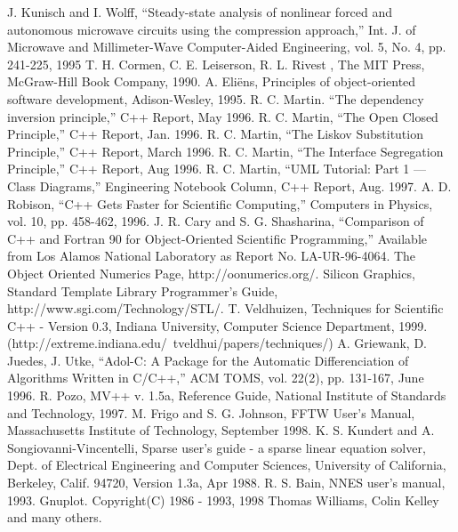 \begin{thebibliography}{99}
 J. Kunisch and I. Wolff, ``Steady-state analysis of
nonlinear forced and autonomous microwave circuits using the
compression approach,'' Int. J. of Microwave and Millimeter-Wave
Computer-Aided Engineering, vol. 5, No. 4, pp. 241-225, 1995
%
T. H. Cormen, C. E. Leiserson, R. L. Rivest
,
\newblock The MIT Press, McGraw-Hill Book Company, 1990.
%
 A. Eli\"ens, {Principles of object-oriented
software development}, Adison-Wesley, 1995.
%
 R. C. Martin. ``The dependency inversion principle,''
{C++ Report}, May 1996.
%
 R. C. Martin, ``The Open Closed Principle,'' {C++
Report}, Jan. 1996.
%
 R. C. Martin, ``The Liskov Substitution Principle,''
{C++ Report}, March 1996.
%
 R. C. Martin, ``The Interface Segregation Principle,''
{C++ Report}, Aug 1996.
%
 R. C. Martin, ``UML Tutorial: Part 1 --- Class
Diagrams,'' Engineering Notebook Column, {C++ Report}, Aug. 1997.
%
 A. D. Robison, ``C++ Gets Faster for Scientific
Computing,'' {Computers in Physics}, vol. 10, pp. 458-462, 1996.
%
 J. R. Cary and S. G. Shasharina, ``Comparison of
C++ and Fortran 90 for Object-Oriented Scientific Programming,''
Available from Los Alamos National Laboratory as Report
No. LA-UR-96-4064.
%
 The Object Oriented Numerics Page,
http://oonumerics.org/.
%
 Silicon Graphics, Standard Template Library
Programmer's Guide, http://www.sgi.com/Technology/STL/.
%
 T. Veldhuizen, {Techniques for Scientific C++ - Version
0.3}, Indiana University, Computer Science Department,
1999. (http://extreme.indiana.edu/~tveldhui/papers/techniques/)
%
 A. Griewank, D. Juedes, J. Utke, ``Adol-C: A
Package for the Automatic Differenciation of Algorithms Written in
C/C++,'' ACM TOMS, vol. 22(2), pp. 131-167, June 1996.
%
 R. Pozo, {MV++ v. 1.5a}, Reference Guide, National
Institute of Standards and Technology, 1997.
%
 M. Frigo and S. G. Johnson, {FFTW User's Manual},
Massachusetts Institute of Technology, September 1998.
%
 K. S. Kundert and A. Songiovanni-Vincentelli, {Sparse
user's guide - a sparse linear equation solver}, Dept. of
Electrical Engineering and Computer Sciences, University of
California, Berkeley, Calif. 94720, Version 1.3a, Apr 1988.
%
 R. S. Bain, {NNES user's manual}, 1993.
%
 Gnuplot. Copyright(C) 1986 - 1993, 1998 Thomas
Williams, Colin Kelley and many others.

\end{thebibliography}
